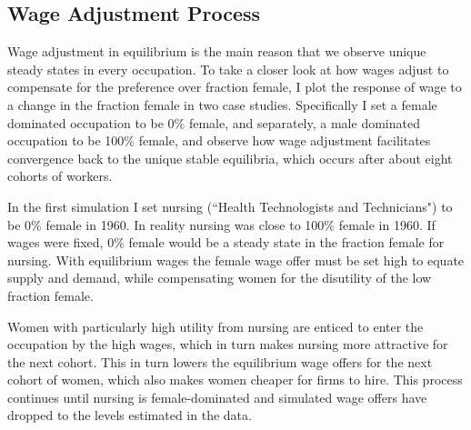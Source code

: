 \documentclass[12pt]{article}
\begin{document}
\subsection{Wage Adjustment Process}
Wage adjustment in equilibrium is the main reason that we observe unique steady states in every occupation. To take a closer look at how wages adjust to compensate for the preference over fraction female, I plot the response of wage to a change in the fraction female in two case studies. Specifically I set a female dominated occupation to be 0\% female, and separately, a male dominated occupation to be 100\% female, and observe how wage adjustment facilitates convergence back to the unique stable equilibria, which occurs after about eight cohorts of workers.




In the first simulation I set nursing (``Health Technologists and Technicians") to be 0\% female in 1960. In reality nursing was close to 100\% female in 1960. If wages were fixed, 0\% female would be a steady state in the fraction female for nursing. With equilibrium wages the female wage offer must be set high to equate supply and demand, while compensating women for the disutility of the low fraction female.

Women with particularly high utility from nursing are enticed to enter the occupation by the high wages, which in turn makes nursing more attractive for the next cohort. This in turn lowers the equilibrium wage offers for the next cohort of women, which also makes women cheaper for firms to hire. This process continues until nursing is female-dominated and simulated wage offers have dropped to the levels estimated in the data. 

\end{document}
